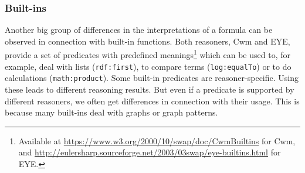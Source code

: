 \subsubsection{Built-ins}
%  
Another big group of differences in the interpretations of a formula can be observed in connection with built-in functions.
Both reasoners, Cwm and EYE, provide 
a set of predicates with predefined meanings\footnote{Available at  \url{https://www.w3.org/2000/10/swap/doc/CwmBuiltins} for Cwm, and 
\url{http://eulersharp.sourceforge.net/2003/03swap/eye-builtins.html} for EYE.}
which can be used to, for example, deal with lists (\texttt{rdf:first}), to compare terms (\texttt{log:equalTo}) or to do calculations (\texttt{math:product}). 
Some built-in predicates are reasoner-specific. Using these leads to different reasoning results. %
But even if a
predicate is supported by different reasoners, we often get differences in connection with their usage.
This is because many built-ins deal with graphs or graph patterns. %


